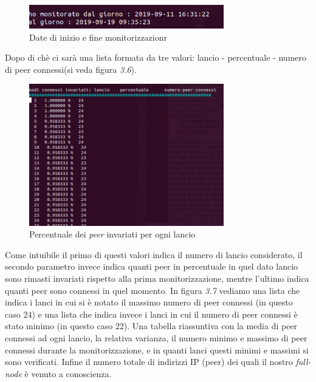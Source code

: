 \begin{figure}[htb]
\begin{center}
   \includegraphics[width=0.755\textwidth]{imgs/tempo.png}
   \caption{Date di inizio e fine monitorizzazionr}
   \end{center}
   \hfill
\end{figure}
Dopo di ch\`e ci sar\`a una lista formata da tre valori: lancio - percentuale - numero di peer connessi(si veda figura \textit{3.6}).
\begin{figure}[htb]
\begin{center}
   \includegraphics[width=0.755\textwidth]{imgs/lista3.png}
   \caption{Percentuale dei \textit{peer} invariati per ogni lancio}
   \end{center}
   \hfill
\end{figure}
Come intuibile il primo di questi valori indica il numero di lancio considerato, il secondo parametro invece indica quanti peer in percentuale in quel dato lancio sono rimasti invariati rispetto alla prima monitorizzazione, mentre l'ultimo indica quanti peer sono connessi in quel momento.
In figura \textit{3.7} vediamo una lista che indica i lanci in cui si \`e notato il massimo numero di peer connessi (in questo caso 24) e una lista che indica invece i lanci in cui il numero di peer connessi \`e stato minimo (in questo caso 22). Una tabella riassuntiva con la media di peer connessi ad ogni lancio, la relativa varianza, il numero minimo e massimo di peer connessi durante la monitorizzazione, e in quanti lanci questi minimi e massimi si sono verificati. Infine il numero totale di indirizzi IP (peer) dei quali il nostro \textit{full-node} \`e venuto a conoscienza.
